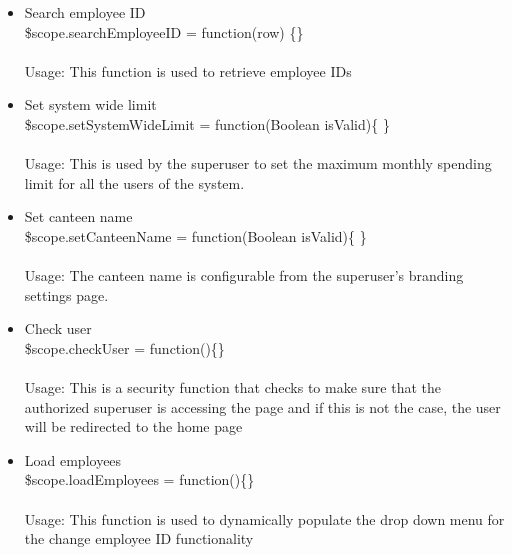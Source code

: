 \documentclass[a4paper,12pt]{article}
\begin{document}
\begin{enumerate}
\begin{itemize}
		\item Search employee ID \\ \$scope.searchEmployeeID = function(row) \{\}
		\\ \\ Usage: This function is used to retrieve employee IDs 
		\item Set system wide limit \\ \$scope.setSystemWideLimit = function(Boolean isValid)\{ \} \\ \\ Usage: This is used by the superuser to set the maximum monthly spending limit for all the users of the system.
		 \item Set canteen name \\ \$scope.setCanteenName = function(Boolean isValid)\{ \}
		\\ \\ Usage: The canteen name is configurable from the superuser's branding settings page.
		\item Check user \\ \$scope.checkUser = function()\{\}
		\\ \\Usage: This is a security function that checks to make sure that the authorized superuser is accessing the page and if this is not the case, the user will be redirected to the home page
		\item Load employees \\ \$scope.loadEmployees = function()\{\}
		\\ \\Usage: This function is used to dynamically populate the drop down menu for the change employee ID functionality
	\end{itemize}
\end{enumerate}
\end{document}
